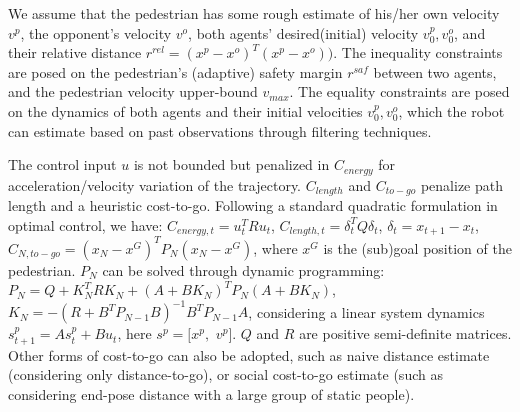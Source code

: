 \documentclass[conference]{IEEEtran}
\begin{document}
We assume that the pedestrian has some rough estimate of 
his/her own velocity $v^p$, the opponent's velocity $v^o$, both agents' 
desired(initial) velocity $v^p_0, v^o_0$, and their relative distance 
$r^{rel} = (x^p-x^o)^T(x^p-x^o))$.
The inequality constraints are posed on the pedestrian's (adaptive) safety margin 
$r^{saf}$ between two 
agents, and the pedestrian velocity upper-bound $v_{max}$. 
The equality constraints are posed on the 
dynamics of both agents and their initial velocities 
$v^p_0, v^o_0$, which the robot can estimate based on past 
observations through filtering techniques. 

The control input $u$ is not bounded but 
penalized in $C_{energy}$ for acceleration/velocity variation of the trajectory. 
$C_{length}$ and $C_{to-go}$ penalize path length and a heuristic cost-to-go. 
Following a standard quadratic formulation in optimal control, we have: $C_{energy,t}=u_t^TRu_t$, 
$C_{length,t}=\delta_t^TQ\delta_t$, $\delta_t = x_{t+1}-x_t$, 
$C_{N,to-go} = (x_N-x^G)^TP_N(x_N-x^G)$, where $x^G$ is the (sub)goal 
position of the pedestrian. $P_N$ can be solved through dynamic programming:
$P_N = Q + K_N^TRK_N + (A+BK_N)^TP_N(A+BK_N)$, 
$K_N = -(R+B^TP_{N-1}B)^{-1}B^TP_{N-1}A$, considering a linear system dynamics
$s^p_{t+1}= As^p_t+Bu_t$, here $s^p = [x^p,$ $v^p]$. $Q$ and $R$ are positive 
semi-definite matrices. Other forms of cost-to-go can also be adopted, such as 
naive distance estimate (considering only distance-to-go), or social 
cost-to-go estimate (such as considering end-pose distance with a large group 
of static people).
\end{document}
